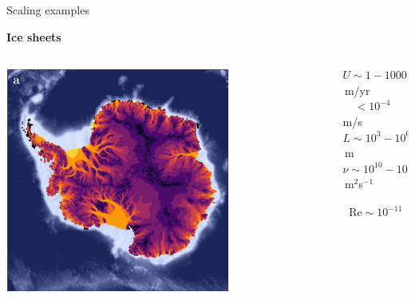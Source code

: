 \documentclass[aspectratio=169,xcolor=dvipsnames]{beamer}
\newcommand\credit[2]{
        \\ \vspace{-0.5em}
        {\color{gray}\scriptsize
        \hfill
        #1
        \hspace{#2}}
        }
\begin{document}
\begin{frame}[t]{Scaling examples}

        \centering
        
        \textbf{Ice sheets}
        
        \vspace{1.0em}

        \begin{columns}
            \begin{column}{0.5\textwidth}
                \hfill
                \includegraphics[width=0.7\textwidth]{figs/Fig-Antarctica-surface-velocity-nolegend.png}
            \end{column}
            \begin{column}{0.4\textwidth}
                \vspace{3em}
                
                $U\sim1-1000$\,m/yr$\quad < 10^{-4}$\,m/s \\
                $L\sim10^3-10^6$\,m \\
                $\nu\sim 10^{10}-10^{12}$\,m$^2$s$^{-1}$
                
                {\boldmath
                \begin{align*}
                    \text{Re}\sim10^{-11}
                \end{align*}
                }

            \end{column}
        \end{columns}

\end{frame}
\end{document}
